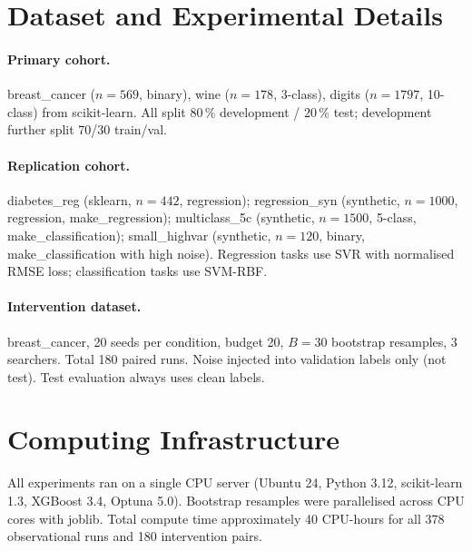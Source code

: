 \documentclass[twoside]{article}
\begin{document}
\section{Dataset and Experimental Details}
\label{app:datasets}

\paragraph{Primary cohort.} breast\_cancer ($n=569$, binary), wine
($n=178$, 3-class), digits ($n=1797$, 10-class) from scikit-learn. All
split 80\,\% development / 20\,\% test; development further split 70/30
train/val.

\paragraph{Replication cohort.} diabetes\_reg (sklearn, $n=442$,
regression); regression\_syn (synthetic, $n=1000$, regression,
make\_regression); multiclass\_5c (synthetic, $n=1500$, 5-class,
make\_classification); small\_highvar (synthetic, $n=120$, binary,
make\_classification with high noise). Regression tasks use SVR with
normalised RMSE loss; classification tasks use SVM-RBF.

\paragraph{Intervention dataset.} breast\_cancer, 20 seeds per
condition, budget 20, $B=30$ bootstrap resamples, 3 searchers. Total
180 paired runs. Noise injected into validation labels only (not test).
Test evaluation always uses clean labels.

\section{Computing Infrastructure}
\label{app:compute}

All experiments ran on a single CPU server (Ubuntu 24, Python 3.12,
scikit-learn 1.3, XGBoost 3.4, Optuna 5.0). Bootstrap resamples were
parallelised across CPU cores with joblib. Total compute time
approximately 40 CPU-hours for all 378 observational runs and 180
intervention pairs.
\end{document}
